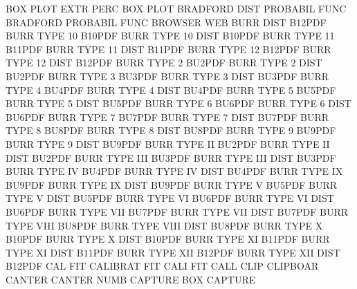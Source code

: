 BOX      PLOT EXTR PERC                 BOX      PLOT
BRADFORD DIST                           PROBABIL FUNC
BRADFORD                                PROBABIL FUNC
BROWSER                                 WEB
BURR     DIST                           B12PDF
BURR     TYPE 10                        B10PDF
BURR     TYPE 10   DIST                 B10PDF
BURR     TYPE 11                        B11PDF
BURR     TYPE 11   DIST                 B11PDF
BURR     TYPE 12                        B12PDF
BURR     TYPE 12   DIST                 B12PDF
BURR     TYPE 2                         BU2PDF
BURR     TYPE 2    DIST                 BU2PDF
BURR     TYPE 3                         BU3PDF
BURR     TYPE 3    DIST                 BU3PDF
BURR     TYPE 4                         BU4PDF
BURR     TYPE 4    DIST                 BU4PDF
BURR     TYPE 5                         BU5PDF
BURR     TYPE 5    DIST                 BU5PDF
BURR     TYPE 6                         BU6PDF
BURR     TYPE 6    DIST                 BU6PDF
BURR     TYPE 7                         BU7PDF
BURR     TYPE 7    DIST                 BU7PDF
BURR     TYPE 8                         BU8PDF
BURR     TYPE 8    DIST                 BU8PDF
BURR     TYPE 9                         BU9PDF
BURR     TYPE 9    DIST                 BU9PDF
BURR     TYPE II                        BU2PDF
BURR     TYPE II   DIST                 BU2PDF
BURR     TYPE III                       BU3PDF
BURR     TYPE III  DIST                 BU3PDF
BURR     TYPE IV                        BU4PDF
BURR     TYPE IV   DIST                 BU4PDF
BURR     TYPE IX                        BU9PDF
BURR     TYPE IX   DIST                 BU9PDF
BURR     TYPE V                         BU5PDF
BURR     TYPE V    DIST                 BU5PDF
BURR     TYPE VI                        BU6PDF
BURR     TYPE VI   DIST                 BU6PDF
BURR     TYPE VII                       BU7PDF
BURR     TYPE VII  DIST                 BU7PDF
BURR     TYPE VIII                      BU8PDF
BURR     TYPE VIII DIST                 BU8PDF
BURR     TYPE X                         B10PDF
BURR     TYPE X    DIST                 B10PDF
BURR     TYPE XI                        B11PDF
BURR     TYPE XI   DIST                 B11PDF
BURR     TYPE XII                       B12PDF
BURR     TYPE XII  DIST                 B12PDF
CAL                                     FIT
CALIBRAT                                FIT
CALI                                    FIT
CALL     CLIP                           CLIPBOAR
CANTER                                  CANTER   NUMB
CAPTURE  BOX                            CAPTURE

